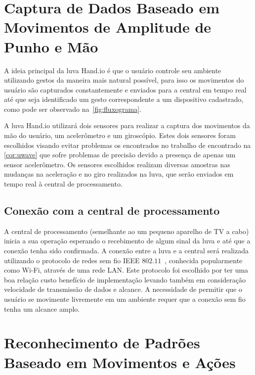\section{Captura de Dados Baseado em Movimentos de Amplitude de Punho e Mão}

A ideia principal da luva Hand.io é que o usuário controle seu ambiente utilizando gestos da maneira mais natural possível, para isso os movimentos do usuário são capturados constantemente e enviados para a central em tempo real até que seja identificado um gesto correspondente a um dispositivo cadastrado, como pode ser observado na~\autoref{fig:fluxograma}.

A luva Hand.io utilizará dois sensores para realizar a captura dos movimentos da mão do usuário, um acelerômetro e um giroscópio. Estes dois sensores foram escolhidos visando evitar problemas os encontrados no trabalho de  encontrado na \autoref{cor:uwave} que sofre problemas de precisão devido a presença de apenas um sensor acelerômetro.
% 
Os sensores escolhidos realizam diversas amostras nas mudanças na aceleração e no giro realizados na luva, que serão enviados em tempo real à central de processamento.%



\subsection{Conexão com a central de processamento}

A central de processamento (semelhante ao um pequeno aparelho de TV a cabo) inicia a sua operação esperando o recebimento de algum sinal da luva e até que a conexão tenha sido confirmada.
% 
A conexão entre a luva e a central será realizada utilizando o protocolo de redes sem fio IEEE $802$.$11$~\cite{802.11:1997}, conhecida popularmente como Wi-Fi, através de uma rede LAN. Este protocolo foi escolhido por ter uma boa relação custo benefício de implementação levando também em consideração velocidade de transmissão de dados e alcance. A necessidade de permitir que o usuário se movimente livremente em um ambiente requer que a conexão sem fio tenha um alcance amplo.


\section{Reconhecimento de Padrões Baseado em Movimentos e Ações}

